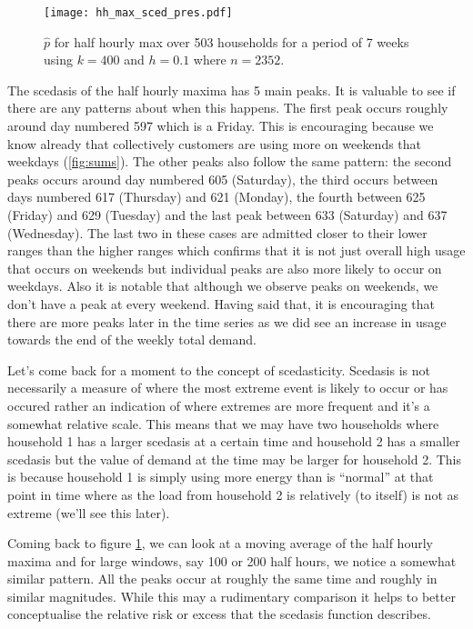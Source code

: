 \begin{figure}
\centering
\texttt{[image: hh\_max\_sced\_pres.pdf]}
\caption{\label{fig:mysced_hh_max} $\hat{p}$ for half hourly max over 503 households for a period of 7 weeks using $k=400$ and $h=0.1$ where $n=2352$.}
\end{figure}

The scedasis of the half hourly maxima has 5 main peaks. It is valuable to see if there are any patterns about when this happens. The first peak occurs roughly around day numbered 597 which is a Friday. This is encouraging because we know already that collectively customers are using more on weekends that weekdays (\ref{fig:sums}). The other peaks also follow the same pattern: the second peaks occurs around day numbered 605 (Saturday), the third occurs between days numbered 617 (Thursday) and 621 (Monday), the fourth between 625 (Friday) and 629 (Tuesday) and the last peak between 633 (Saturday) and 637 (Wednesday). The last two in these cases are admitted closer to their lower ranges than the higher ranges which confirms that it is not just overall high usage that occurs on weekends but individual peaks are also more likely to occur on weekdays. Also it is notable that although we observe peaks on weekends, we don't have a peak at every weekend. Having said that, it is encouraging that there are more peaks later in the time series as we did see an increase in usage towards the end of the weekly total demand.

Let's come back for a moment to the concept of scedasticity. Scedasis is not necessarily a measure of where the most extreme event is likely to occur or has occured rather an indication of where extremes are more frequent and it's a somewhat relative scale. This means that we may have two households where household 1 has a larger scedasis at a certain time and household 2 has a smaller scedasis but the value of demand at the time may be larger for household 2. This is because household 1 is simply using more energy than is ``normal'' at that point in time where as the load from household 2 is relatively (to itself) is not as extreme (we'll see this later).

Coming back to figure \ref{fig:mysced_hh_max}, we can look at a moving average of the half hourly maxima and for large windows, say 100 or 200 half hours, we notice a somewhat similar pattern.  All the peaks occur at roughly the same time and roughly in similar magnitudes. While this may a rudimentary comparison it helps to better conceptualise the relative risk or excess that the scedasis function describes.

